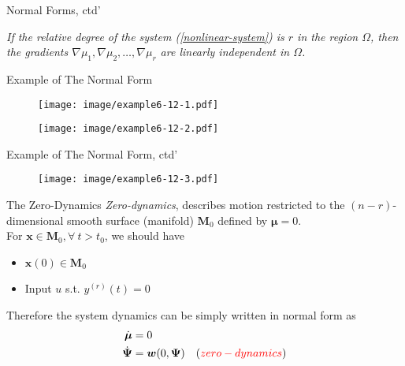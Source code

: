 \documentclass{beamer}
\renewcommand{\vec}[1]{\ensuremath{\boldsymbol{#1}}} %
\begin{document}
\begin{frame}{Normal Forms, ctd'}
    \begin{lemma}[6.5]
    \textit{
    If the relative degree of the system (\ref{nonlinear-system}) is $r$ in the region $\Omega$, then the gradients $\nabla \mu_{1}, \nabla \mu_{2}, \dots, \nabla \mu_{r}$ are linearly independent in $\Omega$.
    }
    \end{lemma}
\end{frame}

\begin{frame}{Example of The Normal Form}
    \begin{figure}
      \centering
      \texttt{[image: image/example6-12-1.pdf]}
    \end{figure}
    \vspace{-20pt}
    \begin{figure}
      \centering
      \texttt{[image: image/example6-12-2.pdf]}
    \end{figure}
\end{frame}

\begin{frame}{Example of The Normal Form, ctd'}
    \begin{figure}
      \centering
      \texttt{[image: image/example6-12-3.pdf]}
    \end{figure}
\end{frame}


\begin{frame}{The Zero-Dynamics}
    \textit{{\color{red}Zero-dynamics}}, describes motion restricted to the $(n-r)$- dimensional smooth surface {\color{red}(manifold) $\vec{M}_{0}$} defined by {\color{red}$\vec{\mu}=0$}.
    \\
    For $\vec{x} \in \vec{M}_{0}, \forall~t>t_{0}$, we should have
    \begin{itemize}
      \item $\vec{x}(0) \in \vec{M}_{0}$
      \item Input $u$ s.t. $y^{(r)}(t)=0$
    \end{itemize}
    Therefore the system dynamics can be simply written in normal form as
    \begin{equation}\label{zero-normal-form}
      \begin{aligned}
        \dot{\vec{\mu}} &= 0 \\
        \dot{\vec{\Psi}}&= \vec{w}(0, \vec{\Psi})\quad ({\color{red}zero-dynamics})
      \end{aligned}
    \end{equation}
\end{frame}
\end{document}
